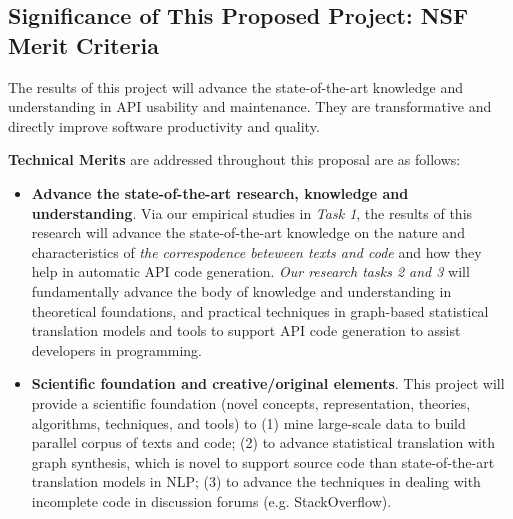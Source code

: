 \subsection{Significance of This Proposed Project: NSF Merit Criteria}
\label{significance-section}

The results of this project will advance the state-of-the-art
knowledge and understanding in API usability and maintenance. They are
transformative and directly improve software productivity and quality.

\noindent
{\bf Technical Merits} are addressed throughout this proposal are as
follows:

\begin{itemize}

  \item {\bf Advance the state-of-the-art research, knowledge and
    understanding}. Via our empirical studies in {\em Task 1}, the
    results of this research will advance the state-of-the-art
    knowledge on the nature and characteristics of {\em the
      correspodence beteween texts and code} and how they help in
    automatic API code generation.
%
{\em Our research tasks 2 and 3} will fundamentally advance the body
of knowledge and understanding in theoretical foundations, and
practical techniques in graph-based statistical translation models and
tools to support API code generation to assist developers in
programming.



  \item {\bf Scientific foundation and creative/original
    elements}. This project will provide a scientific foundation
    (novel concepts, representation, theories, algorithms, techniques,
    and tools) to (1) mine large-scale data to build parallel corpus
    of texts and code; (2) to advance statistical translation with
    graph synthesis, which is novel to support source code than
    state-of-the-art translation models in NLP; (3) to
    advance the techniques in dealing with incomplete code in
    discussion forums (e.g. StackOverflow).




\end{itemize}
